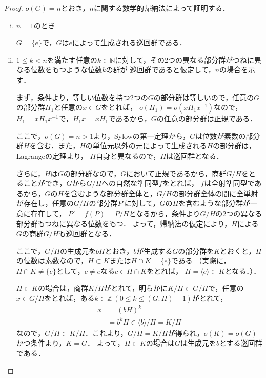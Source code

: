 \documentclass[dvipdfmx,uplatex,11pt]{jsarticle}
\theoremstyle{mytheorem}
\begin{document}
        \begin{leftbar}
            \begin{proof}
                $o(G)=n$とおき，$n$に関する数学的帰納法によって証明する．
                \begin{enumerate}[(i)]
                    \item $n=1$のとき
                    
                    $G= \{e\}$で，$G$は$e$によって生成される巡回群である．
                    \item $1 \le k <n$を満たす任意の$k \in \mathbb{N}$に対して，その2つの異なる部分群がつねに異なる位数をもつような位数$k$の群が
                    巡回群であると仮定して，$n$の場合を示す．

                    まず，条件より，等しい位数を持つ2つの$G$の部分群は等しいので，任意の$G$の部分群$H_1$と任意の$x \in G$をとれば，
                    $o(H_1)=o(xH_1x^{-1})$なので，$H_1 = x H_1 x^{-1}$で，$H_1x = xH_1$であるから，$G$の任意の部分群は正規である．

                    ここで，$o(G)=n>1$より，Sylowの第一定理から，$G$は位数が素数の部分群$H$を含む．また，$H$の単位元以外の元によって生成される$H$の部分群は，Lagrangeの定理より，
                    $H$自身と異なるので，$H$は巡回群となる．

                    さらに，$H$は$G$の部分群なので，$G$において正規であるから，商群$G /H$をとることができ，$G$から$G/H$への自然な準同型$f$をとれば，
                    $f$は全射準同型であるから，$G$の$H$を含むような部分群全体と，$G/H$の部分群全体の間に全単射が存在し，任意の$G/H$の部分群$P'$に対して，$G$の$H$を含むような部分群が一意に存在して，
                    $P' = f(P)=P/H$となるから，条件より$G/H$の2つの異なる部分群もつねに異なる位数をもつ．
                    よって，帰納法の仮定により，$H$による$G$の商群$G/H$も巡回群となる．

                    ここで，$G/H$の生成元を$bH$とおき，$b$が生成する$G$の部分群を$K$とおくと，$H$の位数は素数なので，$H \subset K$または$H \cap K =\{e\}$である
                    （実際に，$H \cap K \ne \{e\}$として，$c \ne e$なる$c \in H \cap K$をとれば，
                    $H = \langle c \rangle \subset K$となる．）．

                    $H \subset K$の場合は，商群$K/H$がとれて，明らかに$K/H \subset G/H$で，任意の$ x\in G/H$をとれば，ある$k \in \mathbb{Z}~(0 \le k \le (G:H)-1)$がとれて，
                    \begin{align*}
                        x & = (bH)^k \\
                        & = b^k H \in \langle b \rangle /H = K/H
                    \end{align*}
                    なので，$G/H \subset K /H$．これより，$G /H = K/H$が得られ，$o(K)=o(G)$かつ条件より，$K=G$．
                    よって，$H \subset K$の場合は$G$は生成元を$b$とする巡回群である．


\end{enumerate}
\end{proof}
\end{leftbar}
\end{document}

